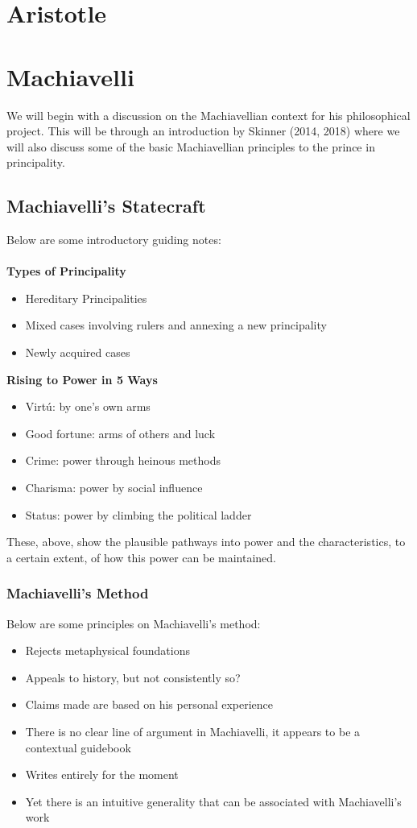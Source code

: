 \documentclass[12pt, letterpaper]{article}
\begin{document}
\newpage
\section{Aristotle}


\newpage
\section{Machiavelli}
We will begin with a discussion on the Machiavellian context for his philosophical project. This will be through an introduction by Skinner (2014, 2018) where we will also discuss some of the basic Machiavellian principles to the prince in principality. 
\subsection{Machiavelli's Statecraft}
Below are some introductory guiding notes:\\\\
\textbf{Types of Principality}
\begin{itemize}
	\item Hereditary Principalities
	\item Mixed cases involving rulers and annexing a new principality
	\item Newly acquired cases
\end{itemize}
\textbf{Rising to Power in 5 Ways}
\begin{itemize}
	\item Virtú: by one's own arms
	\item Good fortune: arms of others and luck
	\item Crime: power through heinous methods
	\item Charisma: power by social influence
	\item Status: power by climbing the political ladder
\end{itemize}
These, above, show the plausible pathways into power and the characteristics, to a certain extent, of how this power can be maintained. 
\subsubsection{Machiavelli's Method}
Below are some principles on Machiavelli's method:
\begin{itemize}
	\item Rejects metaphysical foundations
	\item Appeals to history, but not consistently so?
	\item Claims made are based on his personal experience
	\item There is no clear line of argument in Machiavelli, it appears to be a contextual guidebook
	\item Writes entirely for the moment
	\item Yet there is an intuitive generality that can be associated with Machiavelli's work
\end{itemize}
\end{document}
